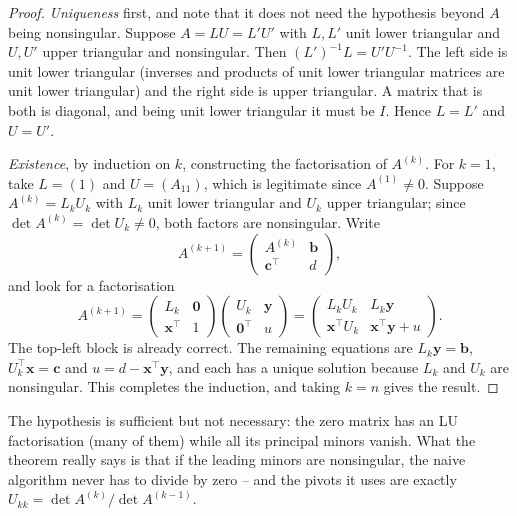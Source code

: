 \begin{proof}
  \emph{Uniqueness} first, and note that it does not need the hypothesis beyond $A$ being nonsingular. Suppose $A = LU = L'U'$ with $L, L'$ unit lower triangular and $U, U'$ upper triangular and nonsingular. Then $(L')^{-1}L = U'U^{-1}$. The left side is unit lower triangular (inverses and products of unit lower triangular matrices are unit lower triangular) and the right side is upper triangular. A matrix that is both is diagonal, and being unit lower triangular it must be $I$. Hence $L = L'$ and $U = U'$.

  \emph{Existence}, by induction on $k$, constructing the factorisation of $A^{(k)}$. For $k = 1$, take $L = (1)$ and $U = (A_{11})$, which is legitimate since $A^{(1)} \neq 0$. Suppose $A^{(k)} = L_kU_k$ with $L_k$ unit lower triangular and $U_k$ upper triangular; since $\det A^{(k)} = \det U_k \neq 0$, both factors are nonsingular. Write
  $$
  A^{(k+1)} = \begin{pmatrix} A^{(k)} & \mathbf{b}\\ \mathbf{c}^\top & d\end{pmatrix},
  $$
  and look for a factorisation
  $$
  A^{(k+1)} = \begin{pmatrix}L_k & \mathbf{0}\\ \mathbf{x}^\top & 1\end{pmatrix}\begin{pmatrix}U_k & \mathbf{y}\\ \mathbf{0}^\top & u\end{pmatrix} = \begin{pmatrix}L_kU_k & L_k\mathbf{y}\\ \mathbf{x}^\top U_k & \mathbf{x}^\top\mathbf{y} + u\end{pmatrix}.
  $$
  The top-left block is already correct. The remaining equations are $L_k\mathbf{y} = \mathbf{b}$, $U_k^\top \mathbf{x} = \mathbf{c}$ and $u = d - \mathbf{x}^\top\mathbf{y}$, and each has a unique solution because $L_k$ and $U_k$ are nonsingular. This completes the induction, and taking $k = n$ gives the result.
\end{proof}

\begin{remark}
  The hypothesis is sufficient but not necessary: the zero matrix has an LU factorisation (many of them) while all its principal minors vanish. What the theorem really says is that if the leading minors are nonsingular, the naive algorithm never has to divide by zero -- and the pivots it uses are exactly $U_{kk} = \det A^{(k)}/\det A^{(k-1)}$.
\end{remark}

